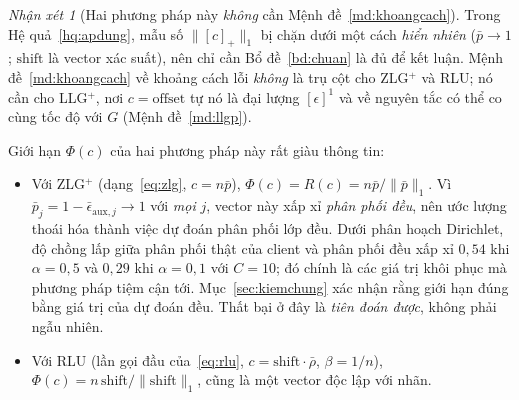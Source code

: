 \documentclass[11pt]{article}
\theoremstyle{remark}
\newtheorem{nhanxet}[dinhly]{Nhận xét}
\newcommand{\pos}[1]{\left[#1\right]_+}
\begin{document}
\begin{nhanxet}[Hai phương pháp này \emph{không} cần Mệnh đề~\ref{md:khoangcach}]
Trong Hệ quả~\ref{hq:apdung}, mẫu số $\|\pos{c}\|_1$ bị chặn dưới một cách
\emph{hiển nhiên} ($\bar p \to 1$; $\mathrm{shift}$ là vector xác suất), nên
chỉ cần Bổ đề~\ref{bd:chuan} là đủ để kết luận. Mệnh đề~\ref{md:khoangcach}
về khoảng cách lỗi \emph{không} là trụ cột cho ZLG$^+$ và RLU; nó cần cho
LLG$^+$, nơi $c = \mathrm{offset}$ tự nó là đại lượng $[\epsilon]^1$ và về
nguyên tắc có thể co cùng tốc độ với $G$
(Mệnh đề~\ref{md:llgp}).
\end{nhanxet}

Giới hạn $\Phi(c)$ của hai phương pháp này rất giàu thông tin:

\begin{itemize}
\item Với ZLG$^+$ (dạng~\eqref{eq:zlg}, $c=n\bar p$),
  $\Phi(c) = R(c) = n\bar p/\|\bar p\|_1$. Vì $\bar p_j = 1-\bar\epsilon_{\mathrm{aux},j}
  \to 1$ với \emph{mọi} $j$, vector này xấp xỉ \emph{phân phối đều}, nên ước
  lượng thoái hóa thành việc dự đoán phân phối lớp đều. Dưới phân hoạch
  Dirichlet, độ chồng lấp giữa phân phối thật của client và phân phối đều xấp
  xỉ $0{,}54$ khi $\alpha = 0{,}5$ và $0{,}29$ khi $\alpha = 0{,}1$ với
  $C = 10$; đó chính là các giá trị khôi phục mà phương pháp tiệm cận tới.
  Mục~\ref{sec:kiemchung} xác nhận rằng giới hạn đúng bằng giá trị của dự
  đoán đều. Thất bại ở đây là \emph{tiên đoán được}, không phải ngẫu nhiên.
\item Với RLU (lần gọi đầu của~\eqref{eq:rlu}, $c=\mathrm{shift}\cdot\bar\rho$,
  $\beta=1/n$), $\Phi(c) = n\,\mathrm{shift}/\|\mathrm{shift}\|_1$, cũng là một
  vector độc lập với nhãn.
\end{itemize}
\end{document}
